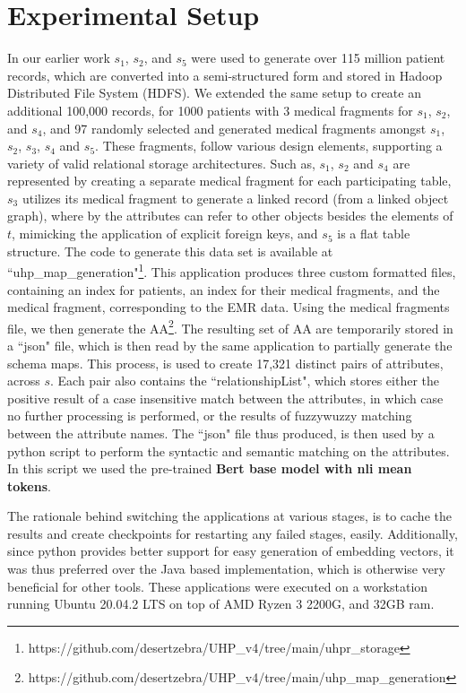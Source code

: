 
\section*{Experimental Setup}
\label{experimentalSetup}
In our earlier work \cite{Satti2020} $s_1$, $s_2$, and $s_5$ were used to generate over 115 million patient records, which are converted into a semi-structured form and stored in Hadoop Distributed File System (HDFS). We extended the same setup to create an additional 100,000 records, for 1000 patients with 3 medical fragments for $s_1$, $s_2$, and $s_4$, and 97 randomly selected and generated medical fragments amongst $s_1$, $s_2$, $s_3$, $s_4$ and $s_5$. These fragments, follow various design elements, supporting a variety of valid relational storage architectures. Such as, $s_1$, $s_2$ and $s_4$ are represented by creating a separate medical fragment for each participating table, $s_3$ utilizes its medical fragment to generate a linked record (from a linked object graph), where by the attributes can refer to other objects besides the elements of $t$, mimicking the application of explicit foreign keys, and $s_5$ is a flat table structure. The code to generate this data set is available at ``uhp\_map\_generation"\footnote{https://github.com/desertzebra/UHP\_v4/tree/main/uhpr\_storage}. This application produces three custom formatted files, containing an index for patients, an index for their medical fragments, and the medical fragment, corresponding to the EMR data. Using the medical fragments file, we then generate the AA\footnote{https://github.com/desertzebra/UHP\_v4/tree/main/uhp\_map\_generation}. The resulting set of AA are temporarily stored in a ``json" file, which is then read by the same application to partially generate the schema maps. This process, is used to create 17,321  distinct pairs of attributes, across $s$. Each pair also contains the ``relationshipList", which stores either the positive result of a case insensitive match between the attributes, in which case no further processing is performed, or the results of fuzzywuzzy matching between the attribute names. 
The ``json" file thus produced, is then used by a python script to perform the syntactic and semantic matching on the attributes. In this script we used the pre-trained \textbf{Bert base model with nli mean tokens}. 

The rationale behind switching the applications at various stages, is to cache the results and create checkpoints for restarting any failed stages, easily. Additionally, since python provides better support for easy generation of embedding vectors, it was thus preferred over the Java based implementation, which is otherwise very beneficial for other tools. These applications were executed on a workstation running Ubuntu 20.04.2 LTS on top of AMD Ryzen 3 2200G, and 32GB ram.




